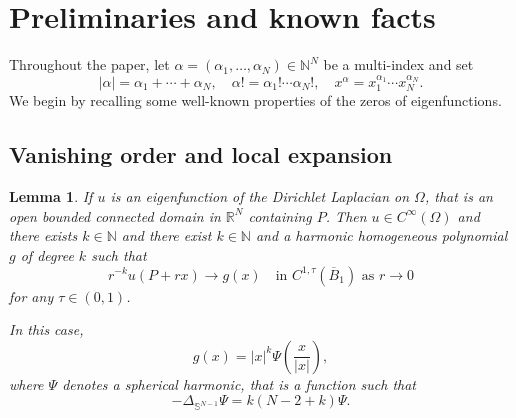 \documentclass[11pt,reqno]{article}
\newtheorem{lemma}[teo]{Lemma}
\numberwithin{equation}{section}
\newcommand\N{\mathbb N}
\newcommand\R{\mathbb R}
\renewcommand\S{\mathbb S}
\newcommand\e\varepsilon
\newcommand\q\quad
\begin{document}
















    
	\section{Preliminaries and known facts}\label{pre}
     Throughout the paper,  let $\alpha = (\alpha_1,\ldots,\alpha_N) \in \mathbb{N}^N$ be a multi-index and set 
    $$
    |\alpha| = \alpha_1 + \cdots + \alpha_N,\q \alpha!=\alpha_1!\cdots\alpha_N!,\q x^\alpha = x_1^{\alpha_1} \cdots x_N^{\alpha_N} .
    $$
    We begin by recalling some well-known properties of the zeros of eigenfunctions.  
    \subsection{Vanishing order and local expansion}
\begin{lemma}\label{lem1}
		If $u$ is an eigenfunction of the Dirichlet Laplacian on $\Omega$, that is an  open bounded connected domain in $\R^N$ containing $P$.
        Then $u\in C^{\infty}(\Omega)$ and there exists $k\in\N$  and there exist  $k\in\N$ and a harmonic homogeneous polynomial  $g$ of degree $k$ such that  
    \[
    r^{-k}u(P+rx) \to g(x) \quad \text{in }C^{1,\tau}(\overline B_1) \text{ as }r\to0 
    \] 
    for any $\tau\in(0,1)$. 

    In this case, 
    \[
    g(x)= |x|^k \Psi\left(\frac{x}{|x|}\right),
    \]
    where $\Psi$ denotes a spherical harmonic, that is a function such that 
		\[
		-\Delta_{\S^{N-1}} \Psi = k(N-2+k) \Psi. 
		\]  
	\end{lemma}
\end{document}
